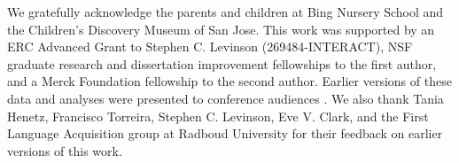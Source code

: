 \documentclass[authoryear, 12pt]{elsarticle}
\begin{document}
We gratefully acknowledge the parents and children at Bing Nursery School and the Children's Discovery Museum of San Jose. This work was supported by an ERC Advanced Grant to Stephen C. Levinson (269484-INTERACT), NSF graduate research and dissertation improvement fellowships to the first author, and a Merck Foundation fellowship to the second author. Earlier versions of these data and analyses were presented to conference audiences \citep{casillas2012, casillas2013}. We also thank Tania Henetz, Francisco Torreira, Stephen C. Levinson, Eve V. Clark, and the First Language Acquisition group at Radboud University for their feedback on earlier versions of this work.



\end{document}
